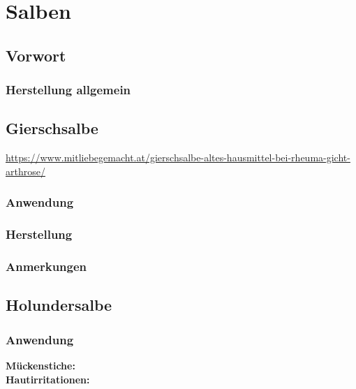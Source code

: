 \chapter{Salben}

\section{Vorwort}

\lipsum[1-5]
\newpage



\subsection{Herstellung allgemein}



\section{Gierschsalbe}

\url{https://www.mitliebegemacht.at/gierschsalbe-altes-hausmittel-bei-rheuma-gicht-arthrose/}

\subsection{Anwendung}

\subsection{Herstellung}

\subsection{Anmerkungen}





\section{Holundersalbe}

\subsection{Anwendung}

\textbf{Mückenstiche:} \\ 

\textbf{Hautirritationen:} \\ 


